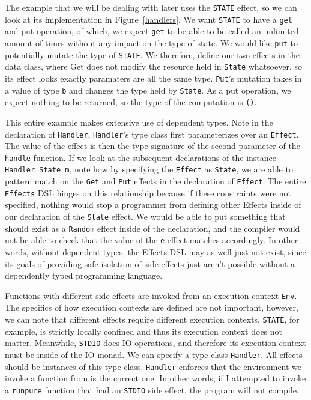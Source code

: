 The example that we will be dealing with later uses the \texttt{STATE} effect,
so we can look at its implementation in Figure~\ref{handlers}. We want
\texttt{STATE} to have a \texttt{get} and {put} operation, of which, we expect
\texttt{get} to be able to be called an unlimited amount of times without any
impact on the type of state. We would like \texttt{put} to potentially mutate
the type of \texttt{STATE}. We therefore, define our two effects in the data
class, where Get does not modify the resource held in \texttt{State} whatsoever,
so its effect looks exactly paramaters are all the same type. \texttt{Put}'s
mutation takes in a value of type \texttt{b} and changes the type held by
\texttt{State}. As a put operation, we expect nothing to be returned, so the
type of the computation is \texttt{()}.

This entire example makes extensive use of dependent types. Note in the
declaration of \texttt{Handler}, \texttt{Handler}'s type class first
parameterizes over an \texttt{Effect}. The value of the effect is then the type
signature of the second parameter of the \texttt{handle} function. If we look at
the subsequent declarations of the instance \texttt{Handler State m}, note how
by specifying the \texttt{Effect} as \texttt{State}, we are able to pattern
match on the \texttt{Get} and \texttt{Put} effects in the declaration of
\texttt{Effect}. The entire \texttt{Effects} DSL hinges on this relationship
because if these constraints were not specified, nothing would stop a programmer
from defining other Effects inside of our declaration of the \texttt{State}
effect. We would be able to put something that should exist as a \texttt{Random}
effect inside of the declaration, and the compiler would not be able to check
that the value of the \texttt{e} effect matches accordingly. In other words,
without dependent types, the Effects DSL may as well just not exist, since its
goals of providing safe isolation of side effects just aren't possible without a
dependently typed programming language.

Functions with different side effects are invoked from an execution context
\texttt{Env}. The specifics of how execution contexts are defined are not
important, however, we can note that different effects require different
execution contexts. \texttt{STATE}, for example, is strictly locally confined
and thus its execution context does not matter. Meanwhile, \texttt{STDIO} does
IO operations, and therefore its execution context must be inside of the IO
monad. We can specify a type class \texttt{Handler}. All effects should be
instances of this type class. \texttt{Handler} enforces that the environment we
invoke a function from is the correct one. In other words, if I attempted to
invoke a \texttt{runpure} function that had an \texttt{STDIO} side effect, the
program will not compile. 

